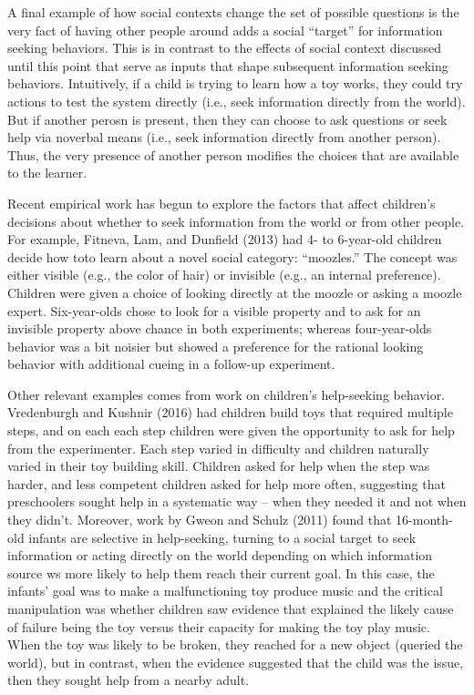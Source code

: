 \documentclass[english,floatsintext,man]{apa6}
\theoremstyle{definition}
\theoremstyle{definition}
\theoremstyle{definition}
\theoremstyle{remark}
\begin{document}
\noindent
A final example of how social contexts change the set of possible
questions is the very fact of having other people around adds a social
\enquote{target} for information seeking behaviors. This is in contrast
to the effects of social context discussed until this point that serve
as inputs that shape subsequent information seeking behaviors.
Intuitively, if a child is trying to learn how a toy works, they could
try actions to test the system directly (i.e., seek information directly
from the world). But if another perosn is present, then they can choose
to ask questions or seek help via noverbal means (i.e., seek information
directly from another person). Thus, the very presence of another person
modifies the choices that are available to the learner.

Recent empirical work has begun to explore the factors that affect
children's decisions about whether to seek information from the world or
from other people. For example, Fitneva, Lam, and Dunfield (2013) had 4-
to 6-year-old children decide how toto learn about a novel social
category: \enquote{moozles.} The concept was either visible (e.g., the
color of hair) or invisible (e.g., an internal preference). Children
were given a choice of looking directly at the moozle or asking a moozle
expert. Six-year-olds chose to look for a visible property and to ask
for an invisible property above chance in both experiments; whereas
four-year-olds behavior was a bit noisier but showed a preference for
the rational looking behavior with additional cueing in a follow-up
experiment.

Other relevant examples comes from work on children's help-seeking
behavior. Vredenburgh and Kushnir (2016) had children build toys that
required multiple steps, and on each each step children were given the
opportunity to ask for help from the experimenter. Each step varied in
difficulty and children naturally varied in their toy building skill.
Children asked for help when the step was harder, and less competent
children asked for help more often, suggesting that preschoolers sought
help in a systematic way -- when they needed it and not when they
didn't. Moreover, work by Gweon and Schulz (2011) found that
16-month-old infants are selective in help-seeking, turning to a social
target to seek information or acting directly on the world depending on
which information source ws more likely to help them reach their current
goal. In this case, the infants' goal was to make a malfunctioning toy
produce music and the critical manipulation was whether children saw
evidence that explained the likely cause of failure being the toy versus
their capacity for making the toy play music. When the toy was likely to
be broken, they reached for a new object (queried the world), but in
contrast, when the evidence suggested that the child was the issue, then
they sought help from a nearby adult.
\end{document}
